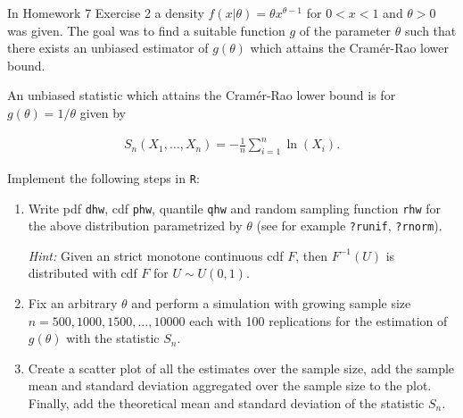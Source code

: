 
\begin{exercise}

In Homework 7 Exercise 2 a density $f(x|\theta) = \theta x^{\theta - 1}$
for $0 < x < 1$ and $\theta > 0$ was given. The goal was to find a suitable
function $g$ of the parameter $\theta$ such that there exists an unbiased
estimator of $g(\theta)$ which attains the Cramér-Rao lower bound.

An unbiased statistic which attains the Cramér-Rao lower bound is for
$g(\theta) = 1/\theta$ given by

\begin{align*}
  S_n(X_1,\dots,X_n) = - \frac{1}{n}\sum_{i=1}^n \ln(X_i).
\end{align*}

Implement the following steps in \texttt{R}:

\begin{enumerate}[label = (\alph*)]
  \item Write pdf \texttt{dhw}, cdf \texttt{phw}, quantile \texttt{qhw}
  and random sampling function \texttt{rhw} for the above distribution
  parametrized by $\theta$ (see for example \texttt{?runif}, \texttt{?rnorm}).

  \textit{Hint:} Given an strict monotone continuous cdf $F$, then $F^{-1}(U)$
  is distributed with cdf $F$ for $U \sim U(0,1)$.

  \item Fix an arbitrary $\theta$ and perform a simulation with growing
  sample size $n = 500, 1000, 1500, \dots, 10000$ each with 100 replications
  for the estimation of $g(\theta)$ with the statistic $S_n$.
  
  \item Create a scatter plot of all the estimates over the sample size,
  add the sample mean and standard deviation aggregated over
  the sample size to the plot. Finally, add the theoretical mean and
  standard deviation of the statistic $S_n$.
\end{enumerate}

\end{exercise}


